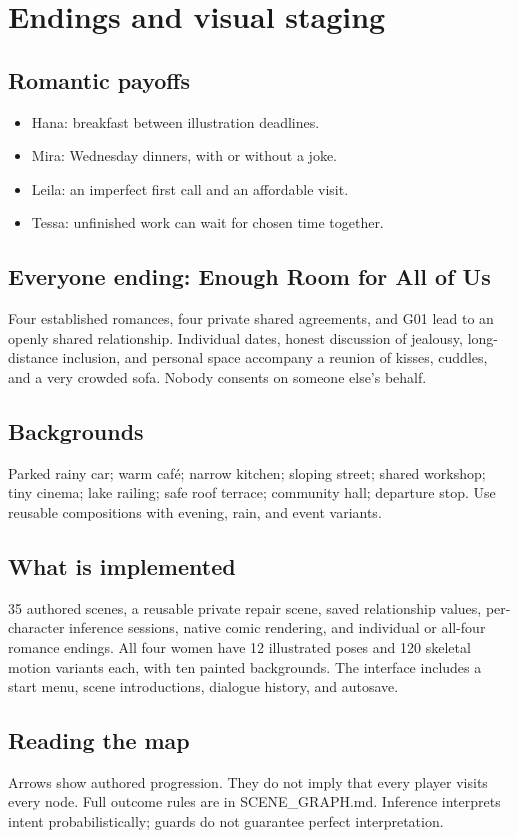 \documentclass[11pt]{article}
\begin{document}
\section*{Endings and visual staging}
\begin{center}\end{center}
\subsection*{Romantic payoffs}
\begin{itemize}\item Hana: breakfast between illustration deadlines.\item Mira: Wednesday dinners, with or without a joke.\item Leila: an imperfect first call and an affordable visit.\item Tessa: unfinished work can wait for chosen time together.\end{itemize}
\subsection*{Everyone ending: Enough Room for All of Us}
Four established romances, four private shared agreements, and G01 lead to an openly shared relationship. Individual dates, honest discussion of jealousy, long-distance inclusion, and personal space accompany a reunion of kisses, cuddles, and a very crowded sofa. Nobody consents on someone else's behalf.
\subsection*{Backgrounds}
Parked rainy car; warm café; narrow kitchen; sloping street; shared workshop; tiny cinema; lake railing; safe roof terrace; community hall; departure stop. Use reusable compositions with evening, rain, and event variants.
\subsection*{What is implemented}
35 authored scenes, a reusable private repair scene, saved relationship values, per-character inference sessions, native comic rendering, and individual or all-four romance endings. All four women have 12 illustrated poses and 120 skeletal motion variants each, with ten painted backgrounds. The interface includes a start menu, scene introductions, dialogue history, and autosave.
\subsection*{Reading the map}
Arrows show authored progression. They do not imply that every player visits every node. Full outcome rules are in SCENE\_GRAPH.md. Inference interprets intent probabilistically; guards do not guarantee perfect interpretation.
\end{document}
